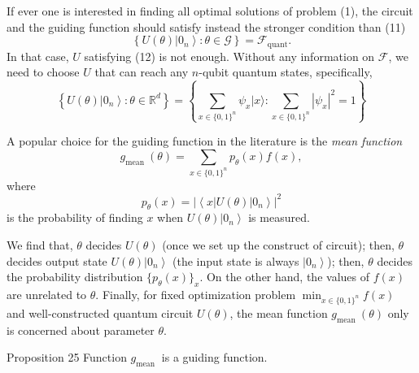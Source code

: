 \begin{remark}
If ever one is interested in finding all optimal solutions of problem (1), the circuit and the guiding function should satisfy instead the stronger condition than (11)
\begin{equation*}
\left\{U(\theta)\left|0_{n}\right\rangle: \theta \in \mathcal{G}\right\}=\mathcal{F}_{\text {quant}}. \tag{13}
\end{equation*}
In that case, $U$ satisfying (12) is not enough. Without any information on $\mathcal{F}$, we need to choose $U$ that can reach any $n$-qubit quantum states, specifically, %
$$
\left\{U(\theta)\left|0_{n}\right\rangle: \theta \in \mathbb{R}^{d}\right\}=\left\{\sum_{x \in\{0,1\}^{n}} \psi_{x}|x\rangle: \sum_{x \in\{0,1\}^{n}}\left|\psi_{x}\right|^{2}=1\right\}
$$
\end{remark}

\begin{definition}
A popular choice for the guiding function in the literature is the \textit{mean function}
\begin{equation*}
g_{\text {mean }}(\theta)=\sum_{x \in\{0,1\}^{n}} p_{\theta}(x) f(x), \tag{14}
\end{equation*}
where
$$
p_{\theta}(x)=\left|\left\langle x|U(\theta)| 0_{n}\right\rangle\right|^{2}
$$
is the probability of finding $x$ when $U(\theta)\left|0_{n}\right\rangle$ is measured.  %
\end{definition}

We find that, $\theta$ decides $U(\theta)$ (once we set up the construct of circuit); then, $\theta$ decides output state $U(\theta)\left|0_{n}\right\rangle$ (the input state is always $\left|0_{n}\right\rangle$); then, $\theta$ decides the probability distribution $\{p_{\theta}(x)\}_{x}$. On the other hand, the values of $f(x)$ are unrelated to $\theta.$ Finally, for fixed optimization problem $\min _{x \in\{0,1\}^{n}} f(x)$ and well-constructed quantum circuit $U(\theta)$, the mean function $g_{\text {mean }}(\theta)$ only is concerned about parameter $\theta.$ 

\begin{proposition}
    Proposition 25 Function $g_{\text {mean }}$ is a guiding function.
\end{proposition}

